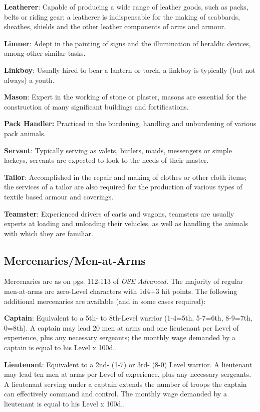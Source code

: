 \documentclass{book}
\begin{document}
\textbf{Leatherer}: Capable of producing a wide range of leather goods,
such as packs, belts or riding gear; a leatherer is indispensable for
the making of scabbards, sheathes, shields and the other leather
components of arms and armour.

\textbf{Limner}: Adept in the painting of signs and the illumination of
heraldic devices, among other similar tasks.

\textbf{Linkboy}: Usually hired to bear a lantern or torch, a linkboy is
typically (but not always) a youth.

\textbf{Mason}: Expert in the working of stone or plaster, masons are
essential for the construction of many significant buildings and
fortifications.

\textbf{Pack Handler:} Practiced in the burdening, handling and
unburdening of various pack animals.

\textbf{Servant}: Typically serving as valets, butlers, maids,
messengers or simple lackeys, servants are expected to look to the needs
of their master.

\textbf{Tailor}: Accomplished in the repair and making of clothes or
other cloth items; the services of a tailor are also required for the
production of various types of textile based armour and coverings.

\textbf{Teamster}: Experienced drivers of carts and wagons, teamsters
are usually experts at loading and unloading their vehicles, as well as
handling the animals with which they are familiar.

\subsection*{Mercenaries/Men-at-Arms}\label{mercenariesmen-at-arms}

Mercenaries are as on pgs. 112-113 of \emph{OSE Advanced.} The majority
of regular men-at-arms are zero-Level characters with 1d4+3 hit points.
The following additional mercenaries are available (and in some cases
required):

\textbf{Captain}: Equivalent to a 5th- to 8th-Level warrior (1-4=5th,
5-7=6th, 8-9=7th, 0=8th). A captain may lead 20 men at arms and one
lieutenant per Level of experience, plus any necessary sergeants; the
monthly wage demanded by a captain is equal to his Level x 100d..

\textbf{Lieutenant}: Equivalent to a 2nd- (1-7) or 3rd- (8-0) Level
warrior. A lieutenant may lead ten men at arms per Level of experience,
plus any necessary sergeants. A lieutenant serving under a captain
extends the number of troops the captain can effectively command and
control. The monthly wage demanded by a lieutenant is equal to his Level
x 100d..
\end{document}
